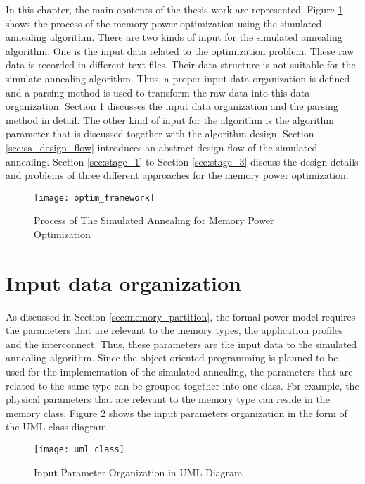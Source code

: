 \label{chap:main_work}
In this chapter, the main contents of the thesis work are represented.
Figure \ref{fig:framework} shows the process of the memory power
optimization using the simulated annealing algorithm.
There are two kinds of input for the simulated annealing algorithm.
One is the input data related to the optimization problem.
These raw data is recorded in different text files. Their data
structure is not suitable for the simulate annealing algorithm.
Thus, a proper input data organization is defined and a parsing
method is used to transform the raw data into this data organization.
Section \ref{sec:input_organ} discusses the input data organization
and the parsing method in detail.
The other kind of input for the algorithm is the algorithm parameter
that is discussed together with the algorithm design.
Section \ref{sec:sa_design_flow} introduces an abstract design flow of
the simulated annealing.
Section \ref{sec:stage_1} to Section \ref{sec:stage_3} discuss the
design details and problems of three different approaches for the memory
power optimization.
\begin{figure}[H]
	\begin{center}
		\texttt{[image: optim\_framework]}
		\caption{Process of The Simulated Annealing for Memory Power Optimization}
		\label{fig:framework}
	\end{center}
\end{figure}
	\section{Input data organization}
	\label{sec:input_organ}
	As discussed in Section \ref{sec:memory_partition}, the formal
	power model requires the parameters that are relevant to the
	memory types, the application profiles and the interconnect.
	Thus, these parameters are the input data to the simulated
	annealing algorithm.
	Since the object oriented programming is planned to be used for
	the implementation of the simulated annealing, the parameters
	that are related to the same type can be grouped together into
	one class. For example, the physical parameters that are
	relevant to the memory type can reside in the memory class.
	Figure \ref{fig:uml} shows the input parameters
	organization in the form of the UML class diagram.
	\begin{figure}[htb]
		\begin{center}
			\texttt{[image: uml\_class]}
			\caption{Input Parameter Organization in UML Diagram}
			\label{fig:uml}
		\end{center}
	\end{figure}
	
